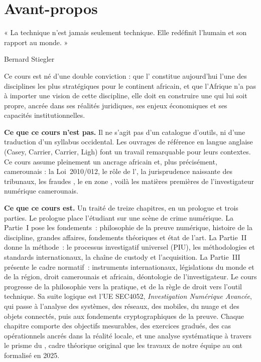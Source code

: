 
\chapter*{Avant-propos}

\epigraph{%
    « La technique n'est jamais seulement technique.
    Elle redéfinit l'humain et son rapport au monde. »%
}{Bernard Stiegler}

\vspace{0.5ex}

Ce cours est né d'une double conviction : que l'
constitue aujourd'hui l'une des disciplines les plus stratégiques pour le continent
africain, et que l'Afrique n'a pas à importer une vision de cette discipline, elle
doit en construire une qui lui soit propre, ancrée dans ses réalités juridiques, ses
enjeux économiques et ses capacités institutionnelles.

\bigskip

\textbf{Ce que ce cours n'est pas.} Il ne s'agit pas d'un catalogue d'outils, ni
d'une traduction d'un syllabus occidental. Les ouvrages de référence en langue
anglaise (Casey, Carrier, Carrier, Ligh) font un travail remarquable pour leurs
contextes. Ce cours assume pleinement un ancrage africain et, plus précisément,
camerounais : la Loi~2010/012, le rôle de l', la jurisprudence
naissante des tribunaux, les fraudes ,
le  en zone , voilà les matières premières
de l'investigateur numérique camerounais.

\bigskip

\textbf{Ce que ce cours est.} Un traité de treize chapitres, en un prologue et
trois parties. Le prologue place l'étudiant sur une scène de crime numérique. La
Partie~I pose les fondements~: philosophie de la preuve numérique, histoire de la
discipline, grandes affaires, fondements théoriques et état de l'art. La
Partie~II donne la méthode~: le processus investigatif universel (PIU), les
méthodologies et standards internationaux, la chaîne de custody et
l'acquisition. La Partie~III présente le cadre normatif~: instruments
internationaux, législations du monde et de la région, droit camerounais et
africain, déontologie de l'investigateur. Le cours progresse de la philosophie
vers la pratique, et de la règle de droit vers l'outil technique. Sa suite
logique est l'UE SEC4052, \emph{Investigation Numérique Avancée}, qui passe à
l'analyse des systèmes, des réseaux, des mobiles, du nuage et des objets
connectés, puis aux fondements cryptographiques de la preuve. Chaque chapitre comporte des objectifs
mesurables, des exercices gradués, des cas opérationnels ancrés dans la réalité
locale, et une analyse systématique à travers le prisme du , cadre théorique original que les travaux de notre équipe au  ont
formalisé en 2025.

